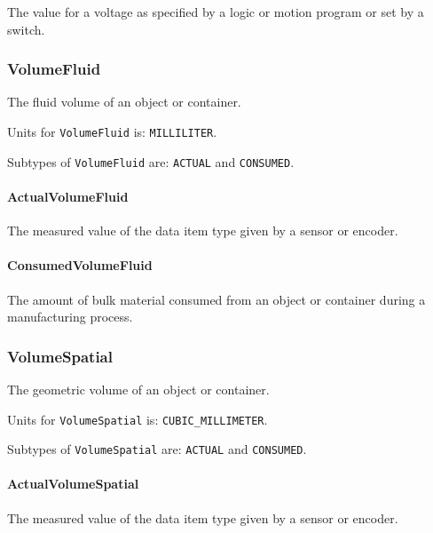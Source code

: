 The value for a voltage as specified by a logic or motion program or set by a switch.


\subsubsection{VolumeFluid}
\label{sec:VolumeFluid}



The fluid volume of an object or container.


Units for \texttt{VolumeFluid} is: \texttt{MILLILITER}.


Subtypes of \texttt{VolumeFluid} are: \texttt{ACTUAL} and \texttt{CONSUMED}. 
\FloatBarrier

\paragraph{ActualVolumeFluid}\mbox{}
\label{sec:ActualVolumeFluid}



The measured value of the data item type given by a sensor or encoder.


\paragraph{ConsumedVolumeFluid}\mbox{}
\label{sec:ConsumedVolumeFluid}



The amount of bulk material consumed from an object or container during a manufacturing process.


\subsubsection{VolumeSpatial}
\label{sec:VolumeSpatial}



The geometric volume of an object or container.


Units for \texttt{VolumeSpatial} is: \texttt{CUBIC_MILLIMETER}.


Subtypes of \texttt{VolumeSpatial} are: \texttt{ACTUAL} and \texttt{CONSUMED}. 
\FloatBarrier

\paragraph{ActualVolumeSpatial}\mbox{}
\label{sec:ActualVolumeSpatial}



The measured value of the data item type given by a sensor or encoder.


